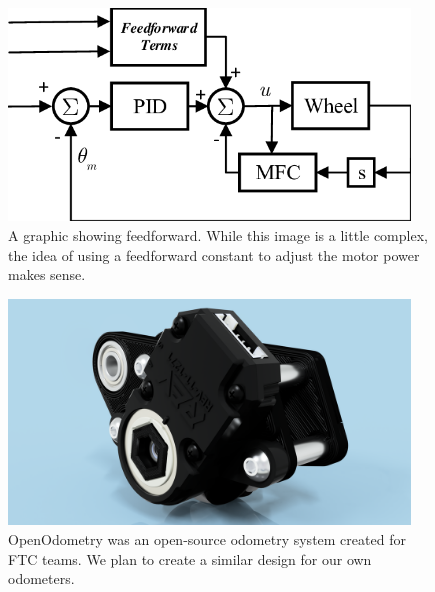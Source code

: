 \begin{figure}[htp]
\centering
\includegraphics[width=0.95\textwidth, angle=0]{Meetings/March/03-24-22/03-24-22 1.png}
\caption{A graphic showing feedforward. While this image is a little complex, the idea of using a feedforward constant to adjust the motor power makes sense.}
\label{fig:032422_1}
\end{figure}

\begin{figure}[htp]
\centering
\includegraphics[width=0.95\textwidth, angle=0]{Meetings/March/03-24-22/03-24-22 2.png}
\caption{OpenOdometry was an open-source odometry system created for FTC teams. We plan to create a similar design for our own odometers.}
\label{fig:032422_2}
\end{figure}

